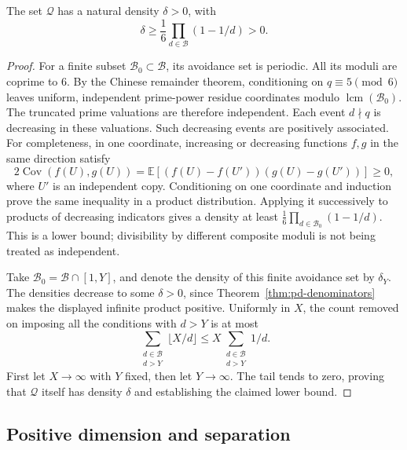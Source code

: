 \begin{lemma}\label{lem:pd-sieve}
The set $\mathcal Q$ has a natural density $\delta>0$, with
\[
 \delta\geq\frac16\prod_{d\in\mathscr B}(1-1/d)>0.
\]
\end{lemma}
\begin{proof}
For a finite subset $\mathscr B_0\subset\mathscr B$, its avoidance
set is periodic. All its moduli are coprime to $6$. By the Chinese
remainder theorem, conditioning on $q\equiv5\pmod6$ leaves uniform,
independent prime-power residue coordinates modulo
$\operatorname{lcm}(\mathscr B_0)$. The truncated prime valuations
are therefore independent. Each event $d\nmid q$ is decreasing in
these valuations. Such decreasing events are positively associated.
For completeness, in one coordinate, increasing or decreasing
functions $f,g$ in the same direction satisfy
\[
 2\operatorname{Cov}(f(U),g(U))
 =\mathbb E[(f(U)-f(U'))(g(U)-g(U'))]\geq0,
\]
where $U'$ is an independent copy. Conditioning on one coordinate
and induction prove the same inequality in a product distribution.
Applying it successively to products of decreasing indicators gives
a density at least $\frac16\prod_{d\in\mathscr B_0}(1-1/d)$.
This is a lower bound; divisibility by different composite moduli
is not being treated as independent.

Take $\mathscr B_0=\mathscr B\cap[1,Y]$, and denote the density of
this finite avoidance set by $\delta_Y$. The densities decrease to
some $\delta>0$, since Theorem~\ref{thm:pd-denominators} makes the
displayed infinite product positive. Uniformly in $X$, the count
removed on imposing all the conditions with $d>Y$ is at most
\[
 \sum_{\substack{d\in\mathscr B\\d>Y}}\lfloor X/d\rfloor
       \leq X\sum_{\substack{d\in\mathscr B\\d>Y}}1/d.
\]
First let $X\to\infty$ with $Y$ fixed, then let $Y\to\infty$.
The tail tends to zero, proving that $\mathcal Q$ itself has density
$\delta$ and establishing the claimed lower bound.
\end{proof}

\subsection{Positive dimension and separation}

